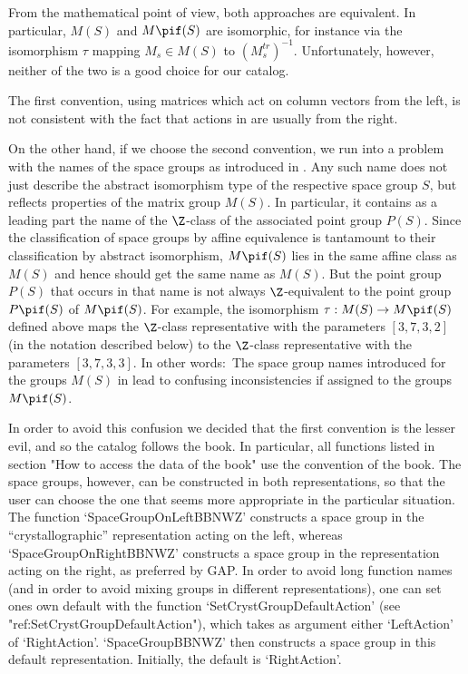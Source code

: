 From the mathematical point of view, both approaches are equivalent. 
In particular, $M(S)$ and $M\pif(S)$ are isomorphic, for instance 
via the isomorphism $\tau$ mapping $M_s \in M(S)$ to 
$(M_s^{tr})^{-1}$.  Unfortunately, however, neither of the two 
is a good choice for our {\GAP} catalog.

The first convention, using matrices which act on column vectors from
the left, is not consistent with the fact that actions in {\GAP} are
usually from the right.

On the other hand, if we choose the second convention, we run into a
problem with the names of the space groups as introduced in
\cite{BBNWZ78}. Any such name does not just describe the abstract
isomorphism type of the respective space group $S$, but reflects
properties of the matrix group $M(S)$.  In particular, it contains as
a leading part the name of the $\Z$-class of the associated point
group $P(S)$.  Since the classification of space groups by affine
equivalence is tantamount to their classification by abstract
isomorphism, $M\pif(S)$ lies in the same affine class as $M(S)$ and
hence should get the same name as $M(S)$.  But the point group $P(S)$
that occurs in that name is not always $\Z$-equivalent to the point
group $P\pif(S)$ of $M\pif(S)$.  For example, the isomorphism $\tau:
M(S) \to M\pif(S)$ defined above maps the $\Z$-class representative
with the parameters $[3,7,3,2]$ (in the notation described below) to
the $\Z$-class representative with the parameters $[3,7,3,3]$.  In
other words:\ The space group names introduced for the groups $M(S)$
in \cite{BBNWZ78} lead to confusing inconsistencies if assigned to the
groups $M\pif(S)$.

In order to avoid this confusion we decided that the first convention
is the lesser evil, and so the {\GAP} catalog follows the book. In
particular, all functions listed in section "How to access the data 
of the book" use the convention of the book. The space groups, however,
can be constructed in both representations, so that the user can choose
the one that seems more appropriate in the particular situation.
The function `SpaceGroupOnLeftBBNWZ' constructs a space group in
the ``crystallographic'' representation acting on the left,
whereas `SpaceGroupOnRightBBNWZ' constructs a space group in the
representation acting on the right, as preferred by GAP. In order to 
avoid long function names (and in order to avoid mixing groups in
different representations), one can set one{\pif}s own default 
with the function `SetCrystGroupDefaultAction' 
(see "ref:SetCrystGroupDefaultAction"), 
which takes as argument either `LeftAction' of `RightAction'. 
`SpaceGroupBBNWZ' then constructs a space group in this default
representation. Initially, the default is `RightAction'.

